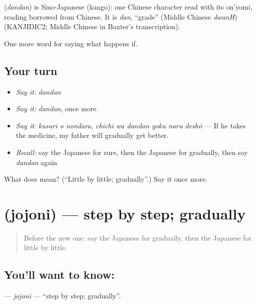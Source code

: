 \begin{cousinweb}
\textbf{} (\emph{dandan}) is Sino-Japanese (kango): one Chinese character read with its on'yomi, reading borrowed from Chinese. It is \emph{dan}, \textquotedblleft{}grade\textquotedblright{} (Middle Chinese \emph{dwanH}) (KANJIDIC2; Middle Chinese in Baxter's transcription).
\end{cousinweb}

\begin{grammarlens}[title={What you've built}]
One more word for saying what happens if.
\end{grammarlens}

\subsection*{Your turn}
\begin{itemize}
\raggedright
  \item \emph{Say it:} \emph{dandan}
  \item \emph{Say it:} \emph{dandan}, once more
  \item \emph{Say it:} \emph{kusuri o nondara, chichi wa dandan yoku naru deshō} — If he takes the medicine, my father will gradually get better.
  \item \emph{Recall:} say the Japanese for sure, then the Japanese for gradually, then say \emph{dandan} again
\end{itemize}

\begin{tcolorbox}[breakable,colback=teal!4,colframe=teal!35!black,title={Before you move on}]
What does  mean? (\textquotedblleft{}Little by little; gradually\textquotedblright{}.) Say it once more.
\end{tcolorbox}
\section[\texorpdfstring{\ja{じょじょに} (jojoni)}{じょじょに (jojoni)}]{ (jojoni) — step by step; gradually}

\label{lesson:JA-C521-jojoni}



\begin{quote}
Before the new one: say the Japanese for gradually, then the Japanese for little by little.
\end{quote}

\subsection*{You'll want to know: }
\textbf{} — \emph{jojoni} — \textquotedblleft{}step by step; gradually\textquotedblright{}.

